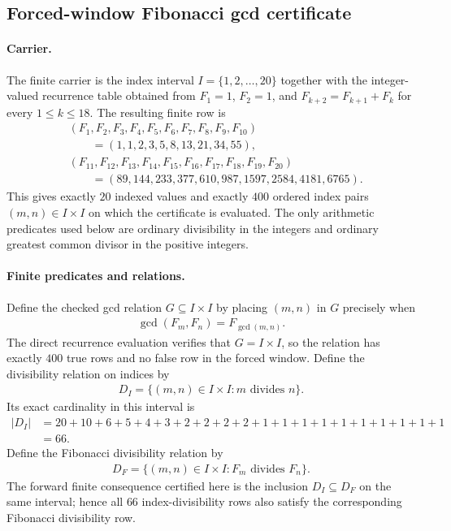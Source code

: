 \subsection{Forced-window Fibonacci gcd certificate}
\label{sec:window6-fib-gcd-strong-divisibility-law-certificate}

\paragraph{Carrier.}
The finite carrier is the index interval $I=\{1,2,\ldots,20\}$ together with the integer-valued recurrence table obtained from $F_1=1$, $F_2=1$, and $F_{k+2}=F_{k+1}+F_k$ for every $1\leq k\leq 18$.  The resulting finite row is
$$
\begin{aligned}
&(F_1,F_2,F_3,F_4,F_5,F_6,F_7,F_8,F_9,F_{10})\\
&\qquad=(1,1,2,3,5,8,13,21,34,55),\\
&(F_{11},F_{12},F_{13},F_{14},F_{15},F_{16},F_{17},F_{18},F_{19},F_{20})\\
&\qquad=(89,144,233,377,610,987,1597,2584,4181,6765).
\end{aligned}
$$
This gives exactly $20$ indexed values and exactly $400$ ordered index pairs $(m,n)\in I\times I$ on which the certificate is evaluated.  The only arithmetic predicates used below are ordinary divisibility in the integers and ordinary greatest common divisor in the positive integers.

\paragraph{Finite predicates and relations.}
Define the checked gcd relation $G\subseteq I\times I$ by placing $(m,n)$ in $G$ precisely when
$$
\begin{aligned}
\gcd(F_m,F_n)=F_{\gcd(m,n)}.
\end{aligned}
$$
The direct recurrence evaluation verifies that $G=I\times I$, so the relation has exactly $400$ true rows and no false row in the forced window.  Define the divisibility relation on indices by
$$
\begin{aligned}
D_I=\{(m,n)\in I\times I:m\text{ divides }n\}.
\end{aligned}
$$
Its exact cardinality in this interval is
$$
\begin{aligned}
|D_I|&=20+10+6+5+4+3+2+2+2+2+1+1+1+1+1+1+1+1+1+1\\
&=66.
\end{aligned}
$$
Define the Fibonacci divisibility relation by
$$
\begin{aligned}
D_F=\{(m,n)\in I\times I:F_m\text{ divides }F_n\}.
\end{aligned}
$$
The forward finite consequence certified here is the inclusion $D_I\subseteq D_F$ on the same interval; hence all $66$ index-divisibility rows also satisfy the corresponding Fibonacci divisibility row.

